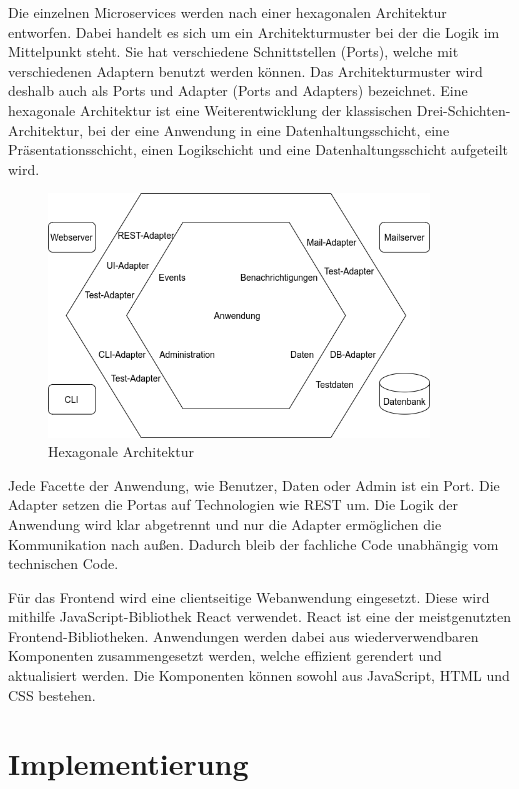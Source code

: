 Die einzelnen Microservices werden nach einer hexagonalen Architektur entworfen. Dabei handelt es sich um ein Architekturmuster bei der die Logik im Mittelpunkt steht. Sie hat verschiedene Schnittstellen (Ports), welche mit verschiedenen Adaptern benutzt werden können. Das Architekturmuster wird deshalb auch als Ports und Adapter (Ports and Adapters) bezeichnet. Eine hexagonale Architektur ist eine Weiterentwicklung der klassischen Drei-Schichten-Architektur, bei der eine Anwendung in eine Datenhaltungsschicht, eine Präsentationsschicht, einen Logikschicht und eine Datenhaltungsschicht aufgeteilt wird.

\begin{figure}[H] 
    \centering
    \includegraphics[width=0.9\textwidth]{figures/HexagonalDesignConcept.png}
    \caption{Hexagonale Architektur}
\end{figure}

Jede Facette der Anwendung, wie Benutzer, Daten oder Admin ist ein Port. Die Adapter setzen die Portas auf Technologien wie REST um. Die Logik der Anwendung wird klar abgetrennt und nur die Adapter ermöglichen die Kommunikation nach außen. Dadurch bleib der fachliche Code unabhängig vom technischen Code.

Für das Frontend wird eine clientseitige Webanwendung eingesetzt. Diese wird mithilfe JavaScript-Bibliothek React verwendet. React ist eine der meistgenutzten Frontend-Bibliotheken.  Anwendungen werden dabei aus wiederverwendbaren Komponenten zusammengesetzt werden, welche effizient gerendert und aktualisiert werden. Die Komponenten können sowohl aus JavaScript, HTML und CSS bestehen.

\clearpage
\section{Implementierung}

